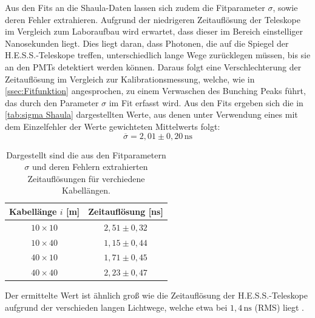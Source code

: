 Aus den Fits an die Shaula-Daten lassen sich zudem die Fitparameter $\sigma$, sowie deren Fehler extrahieren. 
Aufgrund der niedrigeren Zeitauflösung der Teleskope im Vergleich zum Laboraufbau wird erwartet, dass dieser im Bereich einstelliger Nanosekunden liegt. 
Dies liegt daran, dass Photonen, die auf die Spiegel der H.E.S.S.-Teleskope treffen, unterschiedlich lange Wege zurücklegen müssen, bis sie an den PMTs detektiert werden können. 
Daraus folgt eine Verschlechterung der Zeitauflösung im Vergleich zur Kalibrationsmessung, welche, wie in \autoref{ssec:Fitfunktion} angesprochen, zu einem Verwaschen des Bunching Peaks führt, das durch den Parameter $\sigma$ im Fit erfasst wird. 
Aus den Fits ergeben sich die in \autoref{tab:sigma Shaula} dargestellten Werte, aus denen unter Verwendung eines mit dem Einzelfehler der Werte gewichteten Mittelwerts folgt: 
\begin{equation}
    \overline{\sigma} = 2{,}01 \pm 0{,}20\,\mathrm{ns}
\end{equation}
\begin{table}[h]
    \centering
    \begin{tabular}{|c|c|}\hline
        Kabellänge $i$ [m] & Zeitauflösung [ns]  \\\hline
        $10\times 10$      & $2{,}51 \pm 0{,}32$ \\\hline
        $10\times 40$      & $1{,}15 \pm 0{,}44$ \\\hline
        $40\times 10$      & $1{,}71 \pm 0{,}45$ \\\hline
        $40\times 40$      & $2{,}23 \pm 0{,}47$ \\\hline
    \end{tabular}
    \caption{Dargestellt sind die aus den Fitparametern $\sigma$ und deren Fehlern extrahierten Zeitauflösungen für verchiedene Kabellängen.}
    \label{tab:sigma Shaula}
\end{table}
Der ermittelte Wert ist ähnlich groß wie die Zeitauflösung der H.E.S.S.-Teleskope aufgrund der verschieden langen Lichtwege, welche etwa bei $1,4\,\mathrm{ns}$ (RMS) liegt \cite{bernlohrOpticalSystemImaging2003}. 
